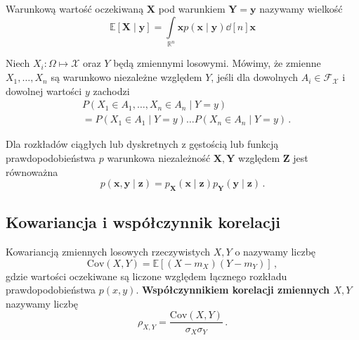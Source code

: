 \documentclass{myclass}
\numberwithin{equation}{section}
\begin{document}
\begin{definition}
Warunkową wartość oczekiwaną \(\mathbf{X}\) pod warunkiem \(\mathbf{Y} = \mathbf{y}\) nazywamy
wielkość
\begin{equation*}
    \mathbb{E}[\mathbf{X} \mid \mathbf{y}] = \int\limits_{\mathbb{R}^n} \mathbf{x} p(\mathbf{x} \mid \mathbf{y}) \dd[n]{\mathbf{x}}
\end{equation*}
\end{definition}

\begin{definition}
Niech \(X_i : \Omega \mapsto \mathcal{X}\) oraz \(Y\) będą zmiennymi losowymi. Mówimy, że zmienne
\(X_1,\ldots,X_n\) są warunkowo niezależne względem \(Y\), jeśli dla dowolnych \(A_i \in
\mathcal{F}_\mathcal{X}\) i dowolnej wartości \(y\) zachodzi
\begin{equation*}
    \begin{split}
        &P(X_1\in A_1,\ldots,X_n\in A_n \mid Y = y) \\
        &= P(X_1 \in A_1 \mid Y = y)\ldots P(X_n \in A_n \mid Y = y)\,.
    \end{split}
\end{equation*}  
\end{definition}

Dla rozkładów ciągłych lub dyskretnych z gęstością lub funkcją prawdopodobieństwa \(p\) warunkowa
niezależność \(\mathbf{X}, \mathbf{Y}\) względem \(\mathbf{Z}\) jest równoważna
\begin{equation*}
    p(\mathbf{x},\mathbf{y} \mid \mathbf{z}) = p_\mathbf{X}(\mathbf{x} \mid \mathbf{z})p_\mathbf{Y}(\mathbf{y} \mid \mathbf{z})\,.
\end{equation*}


\subsection{Kowariancja i współczynnik korelacji}

\begin{definition}[Kowariancji]
Kowariancją zmiennych losowych rzeczywistych \(X, Y\) o nazywamy liczbę
\begin{equation*}
    \mathrm{Cov}(X, Y) = \mathbb{E}[(X - m_X)(Y - m_Y)]\,,
\end{equation*}
gdzie wartości oczekiwane są liczone względem łącznego rozkładu prawdopodobieństwa \(p(x,y)\).
\textbf{Współczynnikiem korelacji zmiennych \(X, Y\)} nazywamy liczbę
\begin{equation*}
    \rho_{X,Y} = \frac{\mathrm{Cov}(X, Y)}{\sigma_X \sigma_Y}\,.
\end{equation*}
\end{definition}
\end{document}
